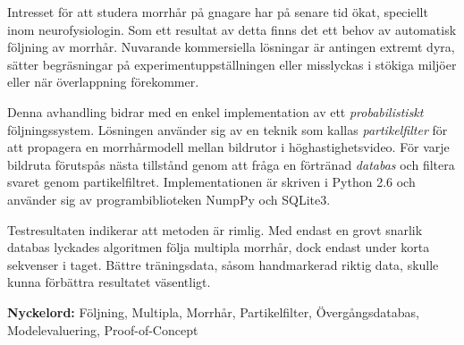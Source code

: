 
Intresset för att studera morrhår på gnagare har på senare tid
ökat, speciellt inom neurofysiologin.  Som ett resultat av detta
finns det ett behov av automatisk följning av morrhår.  Nuvarande
kommersiella lösningar är antingen extremt dyra, sätter
begräsningar på experimentuppställningen eller misslyckas i
stökiga miljöer eller när överlappning förekommer.

Denna avhandling bidrar med en enkel implementation av ett
\emph{probabilistiskt} följningssystem.  Lösningen använder sig av
en teknik som kallas \emph{partikelfilter} för att propagera en
morrhårmodell mellan bildrutor i höghastighetsvideo.  För varje
bildruta förutspås nästa tillstånd genom att fråga en förtränad
\emph{databas} och filtera svaret genom partikelfiltret.
Implementationen är skriven i Python 2.6 och använder sig av
programbiblioteken NumpPy och SQLite3.

Testresultaten indikerar att metoden är rimlig.  Med endast en grovt
snarlik databas lyckades algoritmen följa multipla morrhår, dock
endast under korta sekvenser i taget.  Bättre träningsdata, såsom
handmarkerad riktig data, skulle kunna förbättra resultatet
väsentligt.


\textbf{Nyckelord:} Följning, Multipla, Morrhår, Partikelfilter,
Övergångsdatabas, Modelevaluering, Proof-of-Concept
